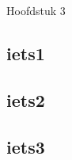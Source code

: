 \label{Hoofdstuk 3}

\begin{sectionbox}{Hoofdstuk 3}\end{sectionbox}

\subsection{iets1}
\lipsum[1]
\subsection{iets2}
\lipsum[2]
\subsection{iets3}
\lipsum[3]

\newpage